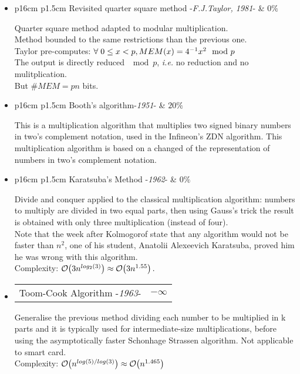 \begin{itemize}
	\item  	\begin{tabularx}{\linewidth}{ p{16cm} p{1.5cm}}
			Revisited quarter square method -\textit{F.J.Taylor, 1981}-  & $0\%$ \\ 
			\end{tabularx}
			Quarter square method adapted to modular multiplication.\\	
			Method bounded to the same restrictions than the previous one.\\
			Taylor pre-computes: $\forall \hspace{1mm} 0 \leq x < p, MEM(x) = 4^{-1} x^{2}\mod p$\\
			The output is directly reduced $\mod p$, \textit{i.e.} no reduction and no mulitplication.\\
			But  $\#MEM  = p n$ bits.

	\item  	\begin{tabularx}{\linewidth}{ p{16cm} p{1.5cm}}
			Booth's algorithm-\textit{1951}-  & $20\%$ \\ 
			\end{tabularx}	
			\noindent
			This is a multiplication algorithm that multiplies two signed binary numbers in two's
			complement notation, used in the Infineon's ZDN algorithm. This multiplication algorithm is based 
			on a changed of the representation of numbers in two's complement notation.

	\item  	\begin{tabularx}{\linewidth}{ p{16cm} p{1.5cm}}
			Karatsuba's Method -\textit{1962}-  & $0\%$  
			\end{tabularx}	
			\noindent
			Divide and conquer applied to the classical multiplication algorithm: 
			numbers to multiply are divided in two equal parts, then using Gauss's 
			trick the result is obtained with only three multiplication (instead of four).\\
			Note that the week after Kolmogorof state that any algorithm would not be faster than $n^2$,
			one of his student, Anatolii Alexeevich Karatsuba, proved him he was wrong with this algorithm.\\
			Complexity:  $\mathop{}\mathopen{}\mathcal{O}\mathopen{}\left(3n^{log_2(3)}\right) \approx \mathop{}\mathopen{}\mathcal{O}\mathopen{}\left(3n^{1.55}\right).$

			
	\item  	\begin{tabularx}{\linewidth}{ p{16cm} p{1.5cm}}
			Toom-Cook Algorithm -\textit{1963}-  & $- \infty$  
			\end{tabularx}	
			\noindent
			Generalise the previous method dividing each number to be multiplied in k 
			parts and it is typically used for intermediate-size multiplications, before using the 						asymptotically faster Schonhage Strassen algorithm. Not applicable to smart card.\\
			Complexity: $\mathop{}\mathopen{}\mathcal{O}\mathopen{}\left(n^{log(5)/log(3)}\right) \approx \mathop{}\mathopen{}\mathcal{O}\mathopen{}\left(n^{1.465}\right)  $


\end{itemize}
